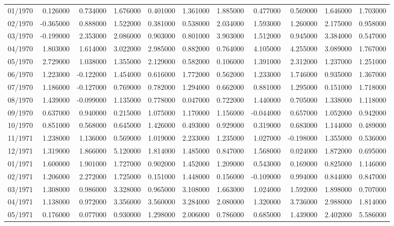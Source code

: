 \begin{tabular}{lrrrrrrrrrr}
01/1970 & 0.126000 & 0.734000 & 1.676000 & 0.401000 & 1.361000 & 1.885000 & 0.477000 & 0.569000 & 1.646000 & 1.703000 \\
02/1970 & -0.365000 & 0.888000 & 1.522000 & 0.381000 & 0.538000 & 2.034000 & 1.593000 & 1.260000 & 2.175000 & 0.958000 \\
03/1970 & -0.199000 & 2.353000 & 2.086000 & 0.903000 & 0.801000 & 3.903000 & 1.512000 & 0.945000 & 3.384000 & 0.547000 \\
04/1970 & 1.803000 & 1.614000 & 3.022000 & 2.985000 & 0.882000 & 0.764000 & 4.105000 & 4.255000 & 3.089000 & 1.767000 \\
05/1970 & 2.729000 & 1.038000 & 1.355000 & 2.129000 & 0.582000 & 0.106000 & 1.391000 & 2.312000 & 1.237000 & 1.251000 \\
06/1970 & 1.223000 & -0.122000 & 1.454000 & 0.616000 & 1.772000 & 0.562000 & 1.233000 & 1.746000 & 0.935000 & 1.367000 \\
07/1970 & 1.186000 & -0.127000 & 0.769000 & 0.782000 & 1.294000 & 0.662000 & 0.881000 & 1.295000 & 0.151000 & 1.718000 \\
08/1970 & 1.439000 & -0.099000 & 1.135000 & 0.778000 & 0.047000 & 0.722000 & 1.440000 & 0.705000 & 1.338000 & 1.118000 \\
09/1970 & 0.637000 & 0.940000 & 0.215000 & 1.075000 & 1.170000 & 1.156000 & -0.044000 & 0.657000 & 1.052000 & 0.942000 \\
10/1970 & 0.851000 & 0.568000 & 0.645000 & 1.426000 & 0.493000 & 0.929000 & 0.319000 & 0.683000 & 1.144000 & 0.489000 \\
11/1971 & 1.238000 & 1.136000 & 0.569000 & 1.019000 & 2.233000 & 1.235000 & 1.027000 & -0.198000 & 1.355000 & 0.536000 \\
12/1971 & 1.319000 & 1.866000 & 5.120000 & 1.814000 & 1.485000 & 0.847000 & 1.568000 & 0.024000 & 1.872000 & 0.695000 \\
01/1971 & 1.600000 & 1.901000 & 1.727000 & 0.902000 & 1.452000 & 1.209000 & 0.543000 & 0.169000 & 0.825000 & 1.146000 \\
02/1971 & 1.206000 & 2.272000 & 1.725000 & 0.151000 & 1.448000 & 0.156000 & -0.109000 & 0.994000 & 0.844000 & 0.847000 \\
03/1971 & 1.308000 & 0.986000 & 3.328000 & 0.965000 & 3.108000 & 1.663000 & 1.024000 & 1.592000 & 1.898000 & 0.707000 \\
04/1971 & 1.138000 & 0.972000 & 3.356000 & 3.560000 & 3.284000 & 2.080000 & 1.320000 & 3.736000 & 2.988000 & 1.814000 \\
05/1971 & 0.176000 & 0.077000 & 0.930000 & 1.298000 & 2.006000 & 0.786000 & 0.685000 & 1.439000 & 2.402000 & 5.586000 \\

\end{tabular}

